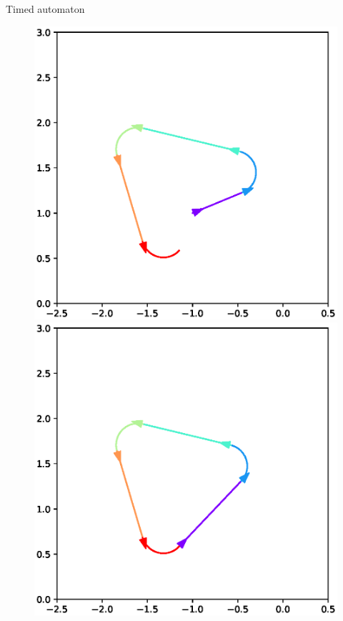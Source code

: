 \documentclass[10pt, xcolor={usenames, dvipsnames}]{beamer}
\begin{document}
\begin{frame}{Timed automaton}
\begin{minipage}[c]{.45\textwidth}
\begin{figure}
\begin{overprint}
                        \includegraphics[width=\textwidth]{imgs/robot_cycle_u}
                        \includegraphics[width=\textwidth]{imgs/robot_cycle_next}
                    \end{overprint}

\end{figure}
\end{minipage}
\end{frame}
\end{document}
